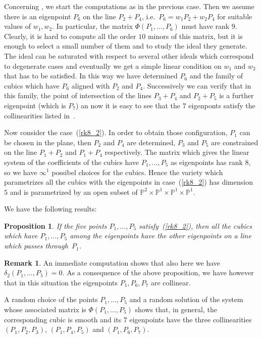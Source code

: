 \documentclass[11pt, a4paper, reqno, captions=tableheading,bibliography=totoc]{scrartcl}
\theoremstyle{plain}
\newtheorem{prop}[lemma]{Proposition}
\theoremstyle{definition}
\newtheorem{rmk}[lemma]{Remark}
\begin{document}
Concerning , we start the computations as in the
previous case. Then we assume there is an eigenpoint $P_6$ on the line
$P_2+P_4$, i.e.\ $P_6 = w_1P_2+w_2P_4$ for suitable values of $w_1, w_2$.
In particular, the matrix $\Phi(P_1, \dots, P_6)$ must have rank
$9$. Clearly, it is hard to compute all the order $10$ minors
of this matrix, but it is enough to select a small number of them
and to study the ideal they generate. The ideal can be saturated with
respect to several other ideals which correspond to degenerate cases
and eventually we get a simple linear condition on $w_1$
and $w_2$ that has to be satisfied. In this way we have determined
$P_6$ and the
family of cubics which have $P_6$ aligned with $P_2$ and $P_4$. Successively
we can verify that in this family, the point of intersection of the
lines $P_3+P_4$ and $P_2+P_5$ is a further eigenpoint (which is $P_7$)
an now it is easy to see that the $7$ eigenponts satisfy the collinearities
listed in~.

Now consider the case~(\ref{rk8_2}). In order to obtain those configuration,
$P_1$ can be chosen in the plane, then $P_2$ and $P_4$ are determined, $P_3$
and $P_5$ are constrained on the line $P_1+P_2$ and $P_1+P_4$ respectively.
The matrix which gives the linear system of the coefficients of the cubics
have $P_1, \dots, P_5$ as eigenpoints has rank $8$, so we have $\infty^1$
possibel choices for the cubics. Hence the variety which parametrizes all
the cubics with the eigenpoints in case~(\ref{rk8_2}) has dimension $5$
and is parametrized by an open subset of
$\mathbb{P}^2\times \mathbb{P}^1\times \mathbb{P}^1\times \mathbb{P}^1$.

We have the following results:
\begin{prop}
\label{prop:rk8_2A}
If the five points $P_1, \dots, P_5$ satisfy~(\ref{rk8_2}), then all the 
cubics which have $P_1, \dots, P_5$ among the eigenpoints have the other
eigenpoints on a line which passes through~$P_1$.
\end{prop}
%
\begin{rmk} 
An immediate computation shows that also here we have 
$\delta_2(P_1, \dots, P_5) = 0$. As a consequence of the above proposition,
we have however that in this situation the eigenpoints $P_1, P_6, P_7$
are collinear. 
\end{rmk}
A random choice of the points $P_1, \dots, P_5$ and a random solution
of the system whose associated matrix is $\Phi(P_1, \dots, P_5)$
shows that, in general, the corresponding cubic is smooth and its $7$
eigenpoints have the three collinearities $(P_1, P_2, P_3)$, $(P_1, P_4, P_5)$
and $(P_1, P_6, P_7)$.
\end{document}

